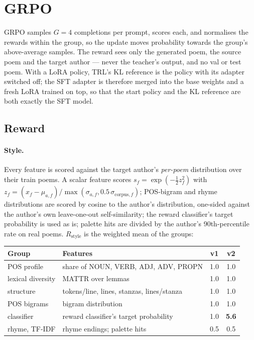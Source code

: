 \documentclass[11pt]{article}
\begin{document}
\section{GRPO}\label{sec:grpo}

GRPO samples $G=4$ completions per prompt, scores each, and normalises the
rewards within the group, so the update moves probability towards the
group's above-average samples. The reward sees only the generated poem, the
source poem and the target author --- never the teacher's output, and no val
or test poem. With a LoRA policy, TRL's KL reference is the policy with its
adapter switched off; the SFT adapter is therefore merged into the base
weights and a fresh LoRA trained on top, so that the start policy and the KL
reference are both exactly the SFT model.

\subsection{Reward}\label{sec:reward}

\paragraph{Style.} Every feature is scored against the target author's
\emph{per-poem} distribution over their train poems. A scalar feature scores
$s_f=\exp(-\tfrac12 z_f^2)$ with
$z_f=(x_f-\mu_{a,f})/\max(\sigma_{a,f},0.5\,\sigma_{\mathrm{corpus},f})$;
POS-bigram and rhyme distributions are scored by cosine to the author's
distribution, one-sided against the author's own leave-one-out
self-similarity; the reward classifier's target probability is used as is;
palette hits are divided by the author's 90th-percentile rate on real poems.
$R_{\mathrm{style}}$ is the weighted mean of the groups:

\begin{center}\small
\begin{tabular}{llcc}
\toprule
Group & Features & v1 & v2 \\
\midrule
POS profile & share of NOUN, VERB, ADJ, ADV, PROPN & 1.0 & 1.0 \\
lexical diversity & MATTR over lemmas & 1.0 & 1.0 \\
structure & tokens/line, lines, stanzas, lines/stanza & 1.0 & 1.0 \\
POS bigrams & bigram distribution & 1.0 & 1.0 \\
classifier & reward classifier's target probability & 1.0 & \textbf{5.6} \\
rhyme, TF-IDF & rhyme endings; palette hits & 0.5 & 0.5 \\
\bottomrule
\end{tabular}
\end{center}
\end{document}
